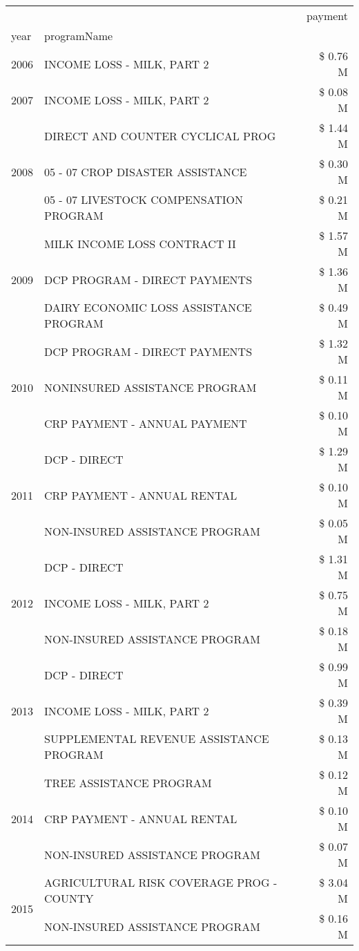 \begin{tabular}{llr}
\toprule
 &  & payment \\
year & programName &  \\
\midrule
2006 & INCOME LOSS - MILK, PART 2 & \$ 0.76 M \\
\cline{1-3}
2007 & INCOME LOSS - MILK, PART 2 & \$ 0.08 M \\
\cline{1-3}
\multirow[t]{3}{*}{2008} & DIRECT AND COUNTER CYCLICAL PROG & \$ 1.44 M \\
 & 05 - 07 CROP DISASTER ASSISTANCE & \$ 0.30 M \\
 & 05 - 07 LIVESTOCK COMPENSATION PROGRAM & \$ 0.21 M \\
\cline{1-3}
\multirow[t]{3}{*}{2009} & MILK INCOME LOSS CONTRACT II & \$ 1.57 M \\
 & DCP PROGRAM - DIRECT PAYMENTS & \$ 1.36 M \\
 & DAIRY ECONOMIC LOSS ASSISTANCE PROGRAM & \$ 0.49 M \\
\cline{1-3}
\multirow[t]{3}{*}{2010} & DCP PROGRAM - DIRECT PAYMENTS & \$ 1.32 M \\
 & NONINSURED ASSISTANCE PROGRAM & \$ 0.11 M \\
 & CRP PAYMENT - ANNUAL PAYMENT & \$ 0.10 M \\
\cline{1-3}
\multirow[t]{3}{*}{2011} & DCP - DIRECT & \$ 1.29 M \\
 & CRP PAYMENT - ANNUAL RENTAL & \$ 0.10 M \\
 & NON-INSURED ASSISTANCE PROGRAM & \$ 0.05 M \\
\cline{1-3}
\multirow[t]{3}{*}{2012} & DCP - DIRECT & \$ 1.31 M \\
 & INCOME LOSS - MILK, PART 2 & \$ 0.75 M \\
 & NON-INSURED ASSISTANCE PROGRAM & \$ 0.18 M \\
\cline{1-3}
\multirow[t]{3}{*}{2013} & DCP - DIRECT & \$ 0.99 M \\
 & INCOME LOSS - MILK, PART 2 & \$ 0.39 M \\
 & SUPPLEMENTAL REVENUE ASSISTANCE PROGRAM & \$ 0.13 M \\
\cline{1-3}
\multirow[t]{3}{*}{2014} & TREE ASSISTANCE PROGRAM & \$ 0.12 M \\
 & CRP PAYMENT - ANNUAL RENTAL & \$ 0.10 M \\
 & NON-INSURED ASSISTANCE PROGRAM & \$ 0.07 M \\
\cline{1-3}
\multirow[t]{3}{*}{2015} & AGRICULTURAL RISK COVERAGE PROG - COUNTY & \$ 3.04 M \\
 & NON-INSURED ASSISTANCE PROGRAM & \$ 0.16 M \\

\end{tabular}
